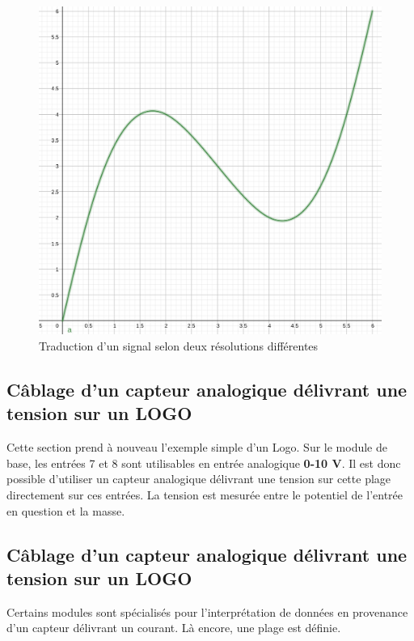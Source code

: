 \documentclass[11pt]{article}
\begin{document}
\begin{figure}[h]
	\centering
	\includegraphics[width=.6\textwidth]{images/courbeAutom.png}
	\caption{Traduction d'un signal selon deux résolutions différentes}
	\label{fig:signalCAN}
\end{figure}

\begin{UPSTIactivite}
\end{UPSTIactivite}
\subsection{Câblage d'un capteur analogique délivrant une tension sur un LOGO}
Cette section prend à nouveau l'exemple simple d'un Logo. 
Sur le module de base, les entrées 7 et 8 sont utilisables en entrée analogique \textbf{0-10 V}. Il est donc possible d'utiliser un capteur analogique délivrant une tension sur cette plage directement sur ces entrées. La tension est mesurée entre le potentiel de l'entrée en question et la masse. 

\begin{UPSTIactivite}
	\vspace{7cm}
\end{UPSTIactivite}

\subsection{Câblage d'un capteur analogique délivrant une tension sur un LOGO}
Certains modules sont spécialisés pour l'interprétation de données en provenance d'un capteur délivrant un courant. Là encore, une plage est définie. 
\end{document}
